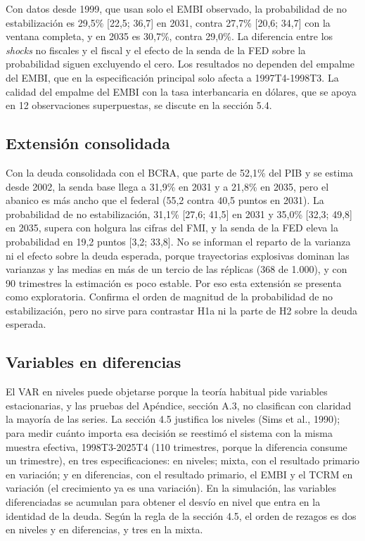 Con datos desde 1999, que usan solo el EMBI observado, la probabilidad
de no estabilización es 29,5\% {[}22,5; 36,7{]} en 2031, contra 27,7\%
{[}20,6; 34,7{]} con la ventana completa, y en 2035 es 30,7\%, contra
29,0\%. La diferencia entre los \emph{shocks} no fiscales y el fiscal y
el efecto de la senda de la FED sobre la probabilidad siguen excluyendo
el cero. Los resultados no dependen del empalme del EMBI, que en la
especificación principal solo afecta a 1997T4-1998T3. La calidad del
empalme del EMBI con la tasa interbancaria en dólares, que se apoya en
12 observaciones superpuestas, se discute en la sección 5.4.

\subsection{Extensión consolidada}

Con la deuda consolidada con el BCRA, que parte de 52,1\% del PIB y se
estima desde 2002, la senda base llega a 31,9\% en 2031 y a 21,8\% en
2035, pero el abanico es más ancho que el federal (55,2 contra 40,5
puntos en 2031). La probabilidad de no estabilización, 31,1\% {[}27,6;
41,5{]} en 2031 y 35,0\% {[}32,3; 49,8{]} en 2035, supera con holgura
las cifras del FMI, y la senda de la FED eleva la probabilidad en 19,2
puntos {[}3,2; 33,8{]}. No se informan el reparto de la varianza ni el
efecto sobre la deuda esperada, porque trayectorias explosivas dominan
las varianzas y las medias en más de un tercio de las réplicas (368 de
1.000), y con 90 trimestres la estimación es poco estable. Por eso esta
extensión se presenta como exploratoria. Confirma el orden de magnitud
de la probabilidad de no estabilización, pero no sirve para contrastar
H1a ni la parte de H2 sobre la deuda esperada.

\subsection{Variables en diferencias}

El VAR en niveles puede objetarse porque la teoría habitual pide
variables estacionarias, y las pruebas del Apéndice, sección A.3, no
clasifican con claridad la mayoría de las series. La sección 4.5
justifica los niveles (Sims et al., 1990); para medir cuánto importa esa
decisión se reestimó el sistema con la misma muestra efectiva,
1998T3-2025T4 (110 trimestres, porque la diferencia consume un
trimestre), en tres especificaciones: en niveles; mixta, con el
resultado primario en variación; y en diferencias, con el resultado
primario, el EMBI y el TCRM en variación (el crecimiento ya es una
variación). En la simulación, las variables diferenciadas se acumulan
para obtener el desvío en nivel que entra en la identidad de la deuda.
Según la regla de la sección 4.5, el orden de rezagos es dos en niveles
y en diferencias, y tres en la mixta.

